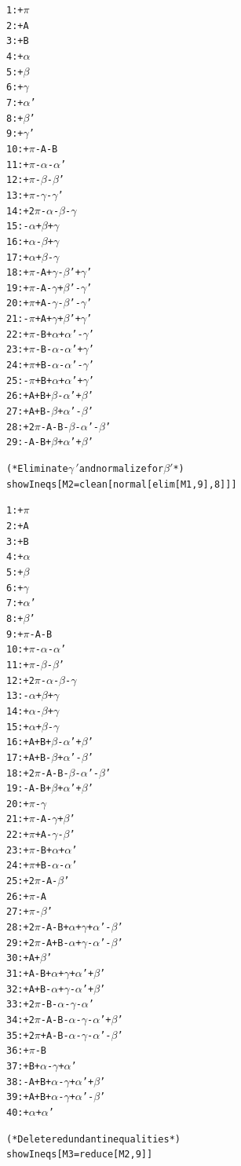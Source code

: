 \documentclass[a4paper, twoside]{article}
\begin{document}
{\begin{alltt}
1: +\(\pi\)
2: +A
3: +B
4: +\(\alpha\)
5: +\(\beta\)
6: +\(\gamma\)
7: +\(\alpha\)'
8: +\(\beta\)'
9: +\(\gamma\)'
10: +\(\pi\)-A-B
11: +\(\pi\)-\(\alpha\)-\(\alpha\)'
12: +\(\pi\)-\(\beta\)-\(\beta\)'
13: +\(\pi\)-\(\gamma\)-\(\gamma\)'
14: +2\(\pi\)-\(\alpha\)-\(\beta\)-\(\gamma\)
15: -\(\alpha\)+\(\beta\)+\(\gamma\)
16: +\(\alpha\)-\(\beta\)+\(\gamma\)
17: +\(\alpha\)+\(\beta\)-\(\gamma\)
18: +\(\pi\)-A+\(\gamma\)-\(\beta\)'+\(\gamma\)'
19: +\(\pi\)-A-\(\gamma\)+\(\beta\)'-\(\gamma\)'
20: +\(\pi\)+A-\(\gamma\)-\(\beta\)'-\(\gamma\)'
21: -\(\pi\)+A+\(\gamma\)+\(\beta\)'+\(\gamma\)'
22: +\(\pi\)-B+\(\alpha\)+\(\alpha\)'-\(\gamma\)'
23: +\(\pi\)-B-\(\alpha\)-\(\alpha\)'+\(\gamma\)'
24: +\(\pi\)+B-\(\alpha\)-\(\alpha\)'-\(\gamma\)'
25: -\(\pi\)+B+\(\alpha\)+\(\alpha\)'+\(\gamma\)'
26: +A+B+\(\beta\)-\(\alpha\)'+\(\beta\)'
27: +A+B-\(\beta\)+\(\alpha\)'-\(\beta\)'
28: +2\(\pi\)-A-B-\(\beta\)-\(\alpha\)'-\(\beta\)'
29: -A-B+\(\beta\)+\(\alpha\)'+\(\beta\)'

(* Eliminate \(\gamma\,'\) and normalize for \(\beta'\) *)
showIneqs[ M2 = clean[normal[elim[M1,9],8]] ] 

1: +\(\pi\)
2: +A
3: +B
4: +\(\alpha\)
5: +\(\beta\)
6: +\(\gamma\)
7: +\(\alpha\)'
8: +\(\beta\)'
9: +\(\pi\)-A-B
10: +\(\pi\)-\(\alpha\)-\(\alpha\)'
11: +\(\pi\)-\(\beta\)-\(\beta\)'
12: +2\(\pi\)-\(\alpha\)-\(\beta\)-\(\gamma\)
13: -\(\alpha\)+\(\beta\)+\(\gamma\)
14: +\(\alpha\)-\(\beta\)+\(\gamma\)
15: +\(\alpha\)+\(\beta\)-\(\gamma\)
16: +A+B+\(\beta\)-\(\alpha\)'+\(\beta\)'
17: +A+B-\(\beta\)+\(\alpha\)'-\(\beta\)'
18: +2\(\pi\)-A-B-\(\beta\)-\(\alpha\)'-\(\beta\)'
19: -A-B+\(\beta\)+\(\alpha\)'+\(\beta\)'
20: +\(\pi\)-\(\gamma\)
21: +\(\pi\)-A-\(\gamma\)+\(\beta\)'
22: +\(\pi\)+A-\(\gamma\)-\(\beta\)'
23: +\(\pi\)-B+\(\alpha\)+\(\alpha\)'
24: +\(\pi\)+B-\(\alpha\)-\(\alpha\)'
25: +2\(\pi\)-A-\(\beta\)'
26: +\(\pi\)-A
27: +\(\pi\)-\(\beta\)'
28: +2\(\pi\)-A-B+\(\alpha\)+\(\gamma\)+\(\alpha\)'-\(\beta\)'
29: +2\(\pi\)-A+B-\(\alpha\)+\(\gamma\)-\(\alpha\)'-\(\beta\)'
30: +A+\(\beta\)'
31: +A-B+\(\alpha\)+\(\gamma\)+\(\alpha\)'+\(\beta\)'
32: +A+B-\(\alpha\)+\(\gamma\)-\(\alpha\)'+\(\beta\)'
33: +2\(\pi\)-B-\(\alpha\)-\(\gamma\)-\(\alpha\)'
34: +2\(\pi\)-A-B-\(\alpha\)-\(\gamma\)-\(\alpha\)'+\(\beta\)'
35: +2\(\pi\)+A-B-\(\alpha\)-\(\gamma\)-\(\alpha\)'-\(\beta\)'
36: +\(\pi\)-B
37: +B+\(\alpha\)-\(\gamma\)+\(\alpha\)'
38: -A+B+\(\alpha\)-\(\gamma\)+\(\alpha\)'+\(\beta\)'
39: +A+B+\(\alpha\)-\(\gamma\)+\(\alpha\)'-\(\beta\)'
40: +\(\alpha\)+\(\alpha\)'

(* Delete redundant inequalities *) 
showIneqs[ M3 = reduce[M2, 9] ]


\end{alltt}}
\end{document}
